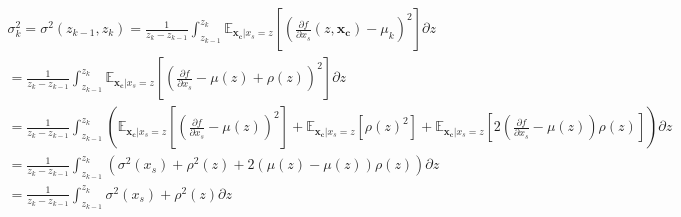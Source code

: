 \documentclass{article}
\newcommand{\xc}{\mathbf{x_c}}
\begin{document}
\begin{gather}
  \sigma^2_k = \sigma^2(z_{k-1}, z_k) = \frac{1}{z_k - z_{k-1}} \int_{z_{k-1}}^{z_k}
  \mathbb{E}_{\xc|x_s=z} \left [ (\frac{\partial f}{\partial x_s}(z, \xc) - \mu_k )^2 \right] \partial z \\
  = \frac{1}{z_k - z_{k-1}} \int_{z_{k-1}}^{z_k}
  \mathbb{E}_{\xc|x_s=z} \left [ (\frac{\partial f}{\partial x_s} - \mu(z) + \rho(z) )^2 \right] \partial z \\
  = \frac{1}{z_k - z_{k-1}} \int_{z_{k-1}}^{z_k} \left(
  \mathbb{E}_{\xc|x_s=z} \left [ (\frac{\partial f}{\partial x_s} - \mu(z) )^2 \right ]  +
  \mathbb{E}_{\xc|x_s=z} \left [ \rho(z)^2 \right] +
  \mathbb{E}_{\xc|x_s=z} \left [ 2(\frac{\partial f}{\partial x_s} - \mu(z) )\rho(z) \right ] \right )  \partial z \\
  = \frac{1}{z_k - z_{k-1}} \int_{z_{k-1}}^{z_k} \left (
  \sigma^2(x_s)  + \rho^2(z) + 2 ( \mu(z) -  \mu(z) )\rho(z) \right )  \partial z \\
  = \frac{1}{z_k - z_{k-1}} \int_{z_{k-1}}^{z_k} \sigma^2(x_s)  + \rho^2(z) \partial z \\
\end{gather}





\end{document}
